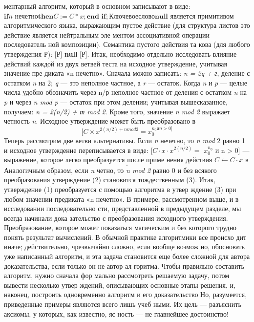 \documentclass{mai_book}
\begin{document}
ментарный   алгоритм,   который   в  основном  записывают  в   виде:
$\textbf{if} \textit{n нечетно} \textbf{then} \textit{C} := \textit{C} \ast \textit{x}; \textbf{end if};  Ключевое слово \textbf{null}$
\pagebreak
является  примитивом  алгоритмического  языка, 
выражающим  пустое  действие  (для  структура­
листов  это  действие  является  нейтральным  эле­
ментом  ассоциативной  операции  последователь­
ной композиции). Семантика пустого действия та­
кова (для любого утверждения Р):  [Р]  \textbf{null} [Р].
\parindent=1cm Итак, необходимо отдельно исследовать влияние действий каждой 
из двух ветвей теста на исходное утверждение, учитывая значение пре­
диката «n нечетно». Сначала можно записать: \textit{n = 2q + г}, деление с
остатком \textit{n} на 2; \textit{q} --- это неполное частное, а \textit{r} --- остаток. Когда \textit{n}
и \textit{p} --- целые числа удобно обозначить через n/р неполное частное  от 
деления с остатком \textit{n} на \textit{p} и через \textit{n mod p} --- остаток при этом делении; 
учитывая вышесказанное,  получаем: \textit{n = 2(n/2) + т mod 2}. Кроме того, 
значение \textit{n mod 2} выражает четность \textit{n}. Исходное  утверждение  может 
быть преобразовано в
\begin{equation}
\textit{$[C\times x^{2(n/2)+n mod 2} = x_{0}^{n_{0} и n > 0]}$}                
	\end{equation}
Теперь рассмотрим две ветви альтернативы. Если \textit{n} нечетно, то \textit{n mod} 
2 равно 1 и исходное утверждение переписывается в виде: [$C \cdot x \cdot x^{2(n/2)}=$
$x_{0}^{n_0}$ и n > 0] --- выражение,  которое легко преобразуется  после приме­
нения  действия $C \leftarrow C \cdot x$ в
\begin{equation}
[C \cdot x^{2(n/2)} = x_0^{n_0} и n > 0].
\end{equation}
Аналогичным образом, если \textit{n} четно, то 
\textit{n mod 2} равно 0 и без  всякого 
преобразования утверждение  (2)  становится тождественным  (3).
\parindent=1cm Итак, утверждение (1) преобразуется с помощью алгоритма в утвер­
ждение  (3)  при любом значении  предиката «n  нечетно».
\parindent=1cm В примере, рассмотренном выше, и в исследовании последовательно­
сти,  представленной в предыдущем  разделе,  мы  всегда начинали  дока­
зательство с преобразования исходного утверждения. Преобразование, 
которое может показаться  магическим  и  без  которого трудно  понять 
результат вычислений. В обычной практике алгоритмики все происхо­
дит  иначе;  действительно,  чрезвычайно  сложно,  если  вообще  возмож­
но, обосновать уже написанный алгоритм, и эта задача становится еще 
более сложной для  автора доказательства, если только он не автор ал­
горитма.  Чтобы  правильно составить  алгоритм,  нужно  сначала фор­
мально рассмотреть решаемую задачу, потом вывести несколько утвер­
ждений, описывающих основные этапы решения, и, наконец, построить 
одновременно алгоритм и его доказательство
\pagebreak
\parindent=1cm Но,  разумеется,  приведенные  примеры  являются  всего  лишь  учеб­
ными.  Их  цель  —  разъяснить  аксиомы,  у  которых,  как  известно,  яс­
ность — не  главнейшее  достоинство!
\end{document}
